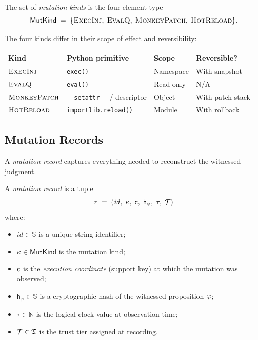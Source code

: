\documentclass[11pt]{article}
\newcommand{\MutK}{\mathsf{MutKind}}             %
\newcommand{\ExecInj}{\textsc{ExecInj}}          %
\newcommand{\EvalQ}{\textsc{EvalQ}}              %
\newcommand{\MPatch}{\textsc{MonkeyPatch}}       %
\newcommand{\HotRel}{\textsc{HotReload}}         %
\newcommand{\Epoch}{\tau}                        %
\newcommand{\PropHash}{\mathsf{h}_\varphi}       %
\begin{document}
\begin{definition}
\label{def:mutation-kind}
The set of \emph{mutation kinds} is the four-element type
\[
  \MutK \;=\; \{\ExecInj,\;\EvalQ,\;\MPatch,\;\HotRel\}.
\]
\end{definition}

The four kinds differ in their scope of effect and reversibility:

\begin{center}
\begin{tabular}{llll}
\toprule
Kind & Python primitive & Scope & Reversible? \\
\midrule
$\ExecInj$ & \texttt{exec()} & Namespace & With snapshot \\
$\EvalQ$   & \texttt{eval()} & Read-only & N/A \\
$\MPatch$  & \texttt{\_\_setattr\_\_} / descriptor & Object & With patch stack \\
$\HotRel$  & \texttt{importlib.reload()} & Module & With rollback \\
\bottomrule
\end{tabular}
\end{center}

\subsection{Mutation Records}
\label{subsec:records}

A \emph{mutation record} captures everything needed to reconstruct the
witnessed judgment.

\begin{definition}
\label{def:mutation-record}
A \emph{mutation record} is a tuple
\[
  r \;=\; (\mathit{id},\;\kappa,\;\coord,\;\PropHash,\;\Epoch,\;\trust)
\]
where:
\begin{itemize}
\item $\mathit{id} \in \mathbb{S}$ is a unique string identifier;
\item $\kappa \in \MutK$ is the mutation kind;
\item $\mathsf{c}$ is the \emph{execution coordinate} (support key) at
      which the mutation was observed;
\item $\PropHash \in \mathbb{S}$ is a cryptographic hash of the
      witnessed proposition $\varphi$;
\item $\Epoch \in \mathbb{N}$ is the logical clock value at
      observation time;
\item $\mathcal{T} \in \mathfrak{T}$ is the trust tier assigned at recording.
\end{itemize}
\end{definition}
\end{document}
